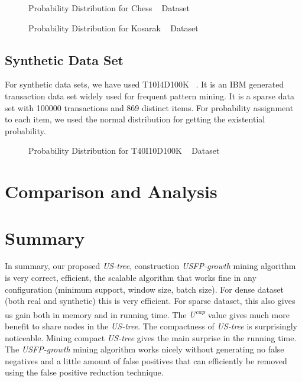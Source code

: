         \begin{figure}[h]
        \centering
            
        \caption{Probability Distribution for Chess ~\cite{dataset} Dataset}
        \label{result:g_dataset_chess}
        \end{figure}
        \begin{figure}[h]
        \centering
            
        \caption{Probability Distribution for Kosarak ~\cite{dataset} Dataset}
        \label{result:g_dataset_kosarak}
        \end{figure}


\subsection{Synthetic Data Set}
For synthetic data sets, we have used T10I4D100K ~\cite{dataset}. It is an IBM generated transaction data set widely used for frequent pattern mining. It is a sparse data set with 100000 transactions and 869 distinct items. For probability assignment to each item, we used the normal distribution for getting the existential probability.
        \begin{figure}[h]
        \centering
            
        \caption{Probability Distribution for T40I10D100K ~\cite{dataset} Dataset}
        \label{result:g_dataset_t10}
        \end{figure}
        
        
\clearpage
\section{Comparison and Analysis}
    

\clearpage
\section{Summary}
In summary, our proposed \emph{US-tree}, construction \emph{USFP-growth} mining algorithm is very correct, efficient, the scalable algorithm that works fine in any configuration (minimum support, window size, batch size). For dense dataset (both real and synthetic) this is very efficient. For sparse dataset, this also gives us gain both in memory and in running time. The \emph{U\textsuperscript{cap}} value gives much more benefit to share nodes in the \emph{US-tree}. The compactness of \emph{US-tree} is surprisingly noticeable. Mining compact \emph{US-tree} gives the main surprise in the running time. The \emph{USFP-growth} mining algorithm works nicely without generating no false negatives and a little amount of false positives that can efficiently be removed using the false positive reduction technique.
%
%